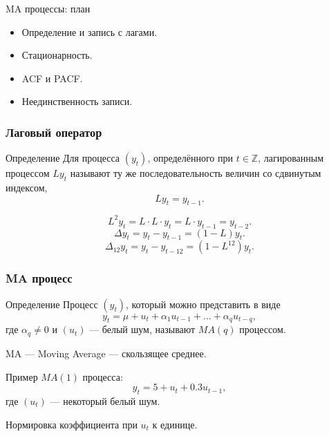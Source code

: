 
\begin{frame} %


\end{frame}



\begin{frame}{MA процессы: план}
  \begin{itemize}[<+->]
    \item Определение и запись с лагами. 
    \item Стационарность. 
    \item ACF и PACF.
    \item Неединственность записи. 
  \end{itemize}

\end{frame}

\begin{frame}
  \frametitle{Лаговый оператор}

  \begin{block}{Определение}
    Для процесса $(y_t)$, определённого при $t \in \mathbb{Z}$, \alert{лагированным} процессом 
    $L y_t$ называют ту же последовательность величин со сдвинутым индексом,
    \[
      L y_t = y_{t-1}.
    \]
  \end{block}

  \pause
  \[
  L^2 y_t = L\cdot L\cdot y_t = L\cdot y_{t-1} = y_{t-2}.  
  \]
  \pause
  \[
  \Delta y_t = y_t - y_{t-1} = (1 - L) y_t.  
  \]
  \pause
  \[
  \Delta_{12} y_t = y_t - y_{t-12} = (1 - L^{12}) y_t.  
  \]
\end{frame}

\begin{frame}
  \frametitle{MA процесс}

  \begin{block}{Определение}
    Процесс $(y_t)$, который \alert{можно} представить в виде
    \[
    y_t = \mu + u_t + \alpha_1 u_{t-1} + \ldots + \alpha_q u_{t-q},  
    \]
    где $\alpha_q \neq 0$ и $(u_t)$ — белый шум, называют $MA(q)$ процессом. 
    
    \alert{MA — Moving Average — скользящее среднее}. 
  \end{block}
  
  \pause
  Пример $MA(1)$ процесса:
  \[
    y_t = 5 + u_t + 0.3 u_{t-1},
  \]
  где $(u_t)$ — некоторый белый шум.
  \pause

  Нормировка коэффициента при $u_t$ \alert{к единице}.

\end{frame}

